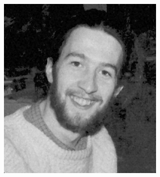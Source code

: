 \documentclass[12pt,a4paper]{report}
\begin{document}
\begin{figure}[!htb]
\begin{minipage}{\linewidth}
\begin{subfigure}{0.49\textwidth}
      \includegraphics[width=\linewidth]{output/noise2_q2_K3P1.png}
    \end{subfigure}


\end{minipage}
\end{figure}
\end{document}
